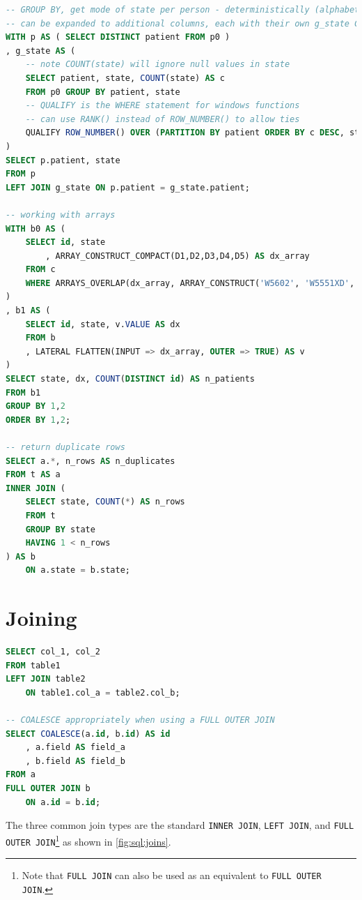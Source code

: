\begin{lstlisting}[language=SQL]
-- GROUP BY, get mode of state per person - deterministically (alphabetical order)
-- can be expanded to additional columns, each with their own g_state CTEs
WITH p AS ( SELECT DISTINCT patient FROM p0 )
, g_state AS (
	-- note COUNT(state) will ignore null values in state
	SELECT patient, state, COUNT(state) AS c
	FROM p0 GROUP BY patient, state
	-- QUALIFY is the WHERE statement for windows functions
	-- can use RANK() instead of ROW_NUMBER() to allow ties
	QUALIFY ROW_NUMBER() OVER (PARTITION BY patient ORDER BY c DESC, state ASC) = 1
)
SELECT p.patient, state
FROM p
LEFT JOIN g_state ON p.patient = g_state.patient;

-- working with arrays
WITH b0 AS (
	SELECT id, state
		, ARRAY_CONSTRUCT_COMPACT(D1,D2,D3,D4,D5) AS dx_array
	FROM c
	WHERE ARRAYS_OVERLAP(dx_array, ARRAY_CONSTRUCT('W5602', 'W5551XD', 'W5803XA'))
)
, b1 AS (
	SELECT id, state, v.VALUE AS dx
	FROM b
	, LATERAL FLATTEN(INPUT => dx_array, OUTER => TRUE) AS v
)
SELECT state, dx, COUNT(DISTINCT id) AS n_patients
FROM b1
GROUP BY 1,2
ORDER BY 1,2;

-- return duplicate rows
SELECT a.*, n_rows AS n_duplicates
FROM t AS a
INNER JOIN (
	SELECT state, COUNT(*) AS n_rows
	FROM t
	GROUP BY state
	HAVING 1 < n_rows
) AS b
	ON a.state = b.state;
\end{lstlisting}

\section{Joining}
\label{sql:join}

\begin{lstlisting}[language=SQL]
SELECT col_1, col_2
FROM table1
LEFT JOIN table2
	ON table1.col_a = table2.col_b;

-- COALESCE appropriately when using a FULL OUTER JOIN
SELECT COALESCE(a.id, b.id) AS id
	, a.field AS field_a
	, b.field AS field_b
FROM a
FULL OUTER JOIN b
	ON a.id = b.id;
\end{lstlisting}

The three common join types are the standard
\texttt{INNER JOIN}, \texttt{LEFT JOIN},
and \texttt{FULL OUTER JOIN}\footnote{Note that
\texttt{FULL JOIN} can also be used as an equivalent to \texttt{FULL OUTER JOIN}.} as
shown in \cref{fig:sql:joins}.

